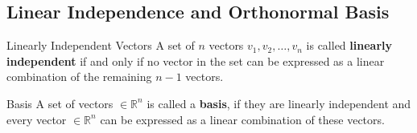 \documentclass[10pt, aspectratio=169]{beamer}
\begin{document}
\subsection{Linear Independence and Orthonormal Basis}

\begin{frame}

\begin{block}{Linearly Independent Vectors}
A set of $n$ vectors $v_1, v_2, \ldots , v_n$ is called \textbf{linearly independent} if and only if no vector in the set can be expressed as a linear combination of the remaining $n - 1$ vectors.
\end{block}

\begin{block}{Basis}
A set of vectors $\in \mathbb{R}^n$ is called a \textbf{basis}, if they are linearly independent and every vector $\in \mathbb{R}^n$ can be expressed as a linear combination of these vectors.
\end{block}
\end{frame}
\end{document}
